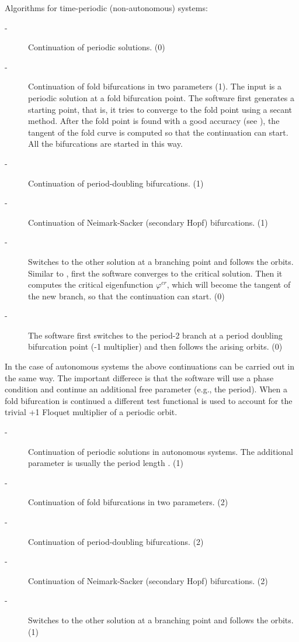 \documentclass[10pt,a4paper]{ddedoc}
\begin{document}
\begin{description}
Algorithms for time-periodic (non-autonomous) systems:
\begin{description}
\item[ -] Continuation of periodic solutions. (0)
%
\item[ -] Continuation of fold bifurcations in two parameters (1). The input is a periodic solution at a fold bifurcation point. The software first generates a starting point, that is, it tries to converge to the fold point using a secant method. After the fold point is found with a good accuracy (see ), the tangent of the fold curve is computed so that the continuation can start. All the bifurcations are started in this way.
%
\item[ -] Continuation of period-doubling bifurcations. (1)
%
\item[ -] Continuation of Neimark-Sacker (secondary Hopf) bifurcations. (1)
%
\item[ -] Switches to the other solution at a branching point and follows the orbits. Similar to , first the software converges to the critical solution. Then it computes the critical eigenfunction $\varphi^{cr}$, which will become the tangent of the new branch, so that the continuation can start. (0)
%
\item[ -] The software first switches to the period-2 branch at a period doubling bifurcation point
(-1 multiplier) and then follows the arising orbits. (0)
\end{description}
In the case of autonomous systems the above continuations can be carried out in the same way. The important differece is that the software will use a phase condition and continue an additional free parameter (e.g., the period). When a fold bifurcation is continued a different test functional is used to account for the trivial +1 Floquet multiplier of a periodic orbit.
\begin{description}
\item[ -] Continuation of periodic solutions in autonomous systems. The additional parameter is usually the period length . (1)
%
\item[ -] Continuation of fold bifurcations in two parameters. (2)
%
\item[ -] Continuation of period-doubling bifurcations. (2)
%
\item[ -] Continuation of Neimark-Sacker (secondary Hopf) bifurcations. (2)
%
\item[ -] Switches to the other solution at a branching point and follows the orbits. (1)

\end{description}
\end{description}
\end{document}
